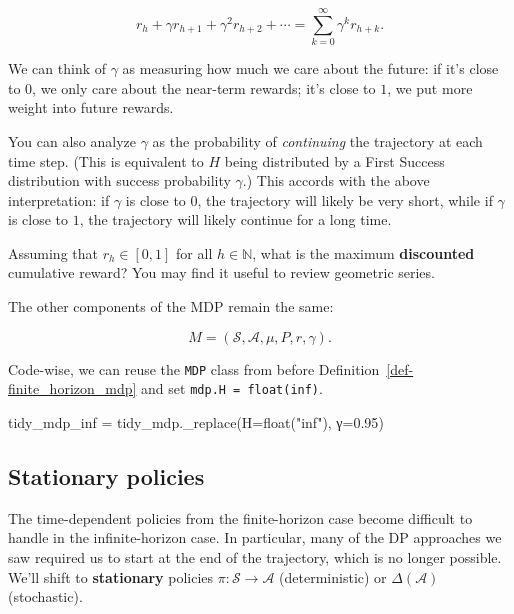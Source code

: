 \documentclass[
  letterpaper,
  DIV=11,
  numbers=noendperiod]{scrreprt}
\newenvironment{Shaded}{\begin{snugshade}}{\end{snugshade}}
\newcommand{\BuiltInTok}[1]{\textcolor[rgb]{0.00,0.23,0.31}{#1}}
\newcommand{\FloatTok}[1]{\textcolor[rgb]{0.68,0.00,0.00}{#1}}
\newcommand{\NormalTok}[1]{\textcolor[rgb]{0.00,0.23,0.31}{#1}}
\newcommand{\OperatorTok}[1]{\textcolor[rgb]{0.37,0.37,0.37}{#1}}
\newcommand{\StringTok}[1]{\textcolor[rgb]{0.13,0.47,0.30}{#1}}
\theoremstyle{plain}
\theoremstyle{plain}
\theoremstyle{definition}
\theoremstyle{definition}
\theoremstyle{remark}
\begin{document}
\[r_h+ \gamma r_{h+1} + \gamma^2 r_{h+2} + \cdots = \sum_{k=0}^\infty \gamma^k r_{h+k}.\]

We can think of \(\gamma\) as measuring how much we care about the
future: if it's close to \(0\), we only care about the near-term
rewards; it's close to \(1\), we put more weight into future rewards.

You can also analyze \(\gamma\) as the probability of \emph{continuing}
the trajectory at each time step. (This is equivalent to \(H\) being
distributed by a First Success distribution with success probability
\(\gamma\).) This accords with the above interpretation: if \(\gamma\)
is close to \(0\), the trajectory will likely be very short, while if
\(\gamma\) is close to \(1\), the trajectory will likely continue for a
long time.

Assuming that \(r_h\in [0, 1]\) for all \(h\in \mathbb{N}\), what is the
maximum \textbf{discounted} cumulative reward? You may find it useful to
review geometric series.

The other components of the MDP remain the same:

\[M = (\mathcal{S}, \mathcal{A}, \mu, P, r, \gamma).\]

Code-wise, we can reuse the \texttt{MDP} class from before
Definition~\ref{def-finite_horizon_mdp} and set
\texttt{mdp.H\ =\ float(\textquotesingle{}inf\textquotesingle{})}.

\begin{Shaded}
\begin{Highlighting}[]
\NormalTok{tidy\_mdp\_inf }\OperatorTok{=}\NormalTok{ tidy\_mdp.\_replace(H}\OperatorTok{=}\BuiltInTok{float}\NormalTok{(}\StringTok{"inf"}\NormalTok{), γ}\OperatorTok{=}\FloatTok{0.95}\NormalTok{)}
\end{Highlighting}
\end{Shaded}

\subsection{Stationary policies}\label{stationary-policies}

The time-dependent policies from the finite-horizon case become
difficult to handle in the infinite-horizon case. In particular, many of
the DP approaches we saw required us to start at the end of the
trajectory, which is no longer possible. We'll shift to
\textbf{stationary} policies \(\pi : \mathcal{S} \to \mathcal{A}\)
(deterministic) or \(\Delta(\mathcal{A})\) (stochastic).
\end{document}
